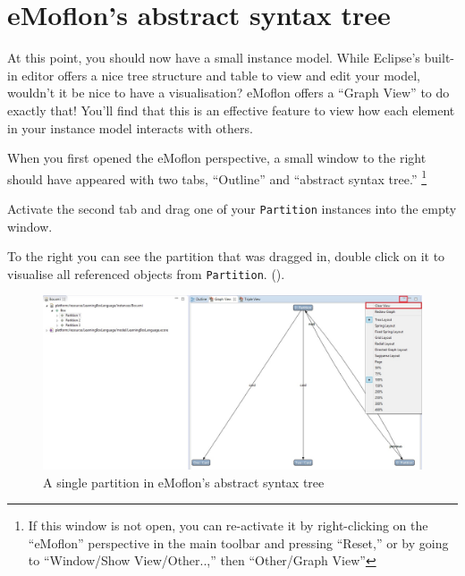 \newpage
\chapter{eMoflon's abstract syntax tree}
\genHeader

At this point, you should now have a small instance model. While Eclipse's built-in editor offers a nice tree structure and table to view and edit your model,
wouldn't it be nice to have a visualisation? eMoflon offers a ``Graph View'' to do exactly that! You'll find that this is an effective
feature to view how each element in your instance model interacts with others.

\begin{stepbystep}

\item When you first opened the eMoflon perspective, a small window to the right should have appeared with two tabs, ``Outline'' and
``abstract syntax tree.'' \footnote{If this window is not open, you can re-activate it by right-clicking on the ``eMoflon'' perspective in the main toolbar and pressing
``Reset,'' or by going to ``Window/Show View/Other..,'' then ``Other/Graph View''} 

\item Activate the second tab and drag one of your \texttt{Partition} instances into the empty window. 

\item To the right you can see the partition that was dragged in, double click on it to visualise all referenced objects from \texttt{Partition}.
().

\vspace{0.5cm}

\begin{figure}[htbp]
	\centering
  \includegraphics[width=1.0\textwidth]{../../org.moflon.doc.handbook.02_leitnersLearningBox/4_graphView/gvImages/eclipse_graphViewInit}
	\caption{A single partition in eMoflon's abstract syntax tree}
	\label{eclipse:graphView_init}
\end{figure}


\end{stepbystep}
